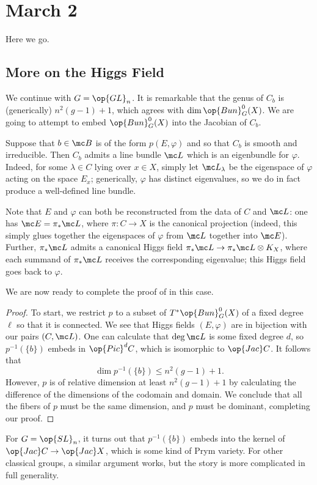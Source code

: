 \documentclass[../notes.tex]{subfiles}
\begin{document}
\section{March 2}
Here we go.

\subsection{More on the Higgs Field}
We continue with $G=\op{GL}_n$. It is remarkable that the genus of $C_b$ is (generically) $n^2(g-1)+1$, which agrees with $\dim\op{Bun}_G^0(X)$. We are going to attempt to embed $\op{Bun}_G^0(X)$ into the Jacobian of $C_b$.
\begin{remark}
	Suppose that $b\in\mc B$ is of the form $p(E,\varphi)$ and so that $C_b$ is smooth and irreducible. Then $C_b$ admits a line bundle $\mc L$ which is an eigenbundle for $\varphi$. Indeed, for some $\lambda\in C$ lying over $x\in X$, simply let $\mc L_\lambda$ be the eigenspace of $\varphi$ acting on the space $E_x$; generically, $\varphi$ has distinct eigenvalues, so we do in fact produce a well-defined line bundle.
\end{remark}
\begin{remark}
	Note that $E$ and $\varphi$ can both be reconstructed from the data of $C$ and $\mc L$: one has $\mc E=\pi_*\mc L$, where $\pi\colon C\to X$ is the canonical projection (indeed, this simply glues together the eigenspaces of $\varphi$ from $\mc L$ together into $\mc E$). Further, $\pi_*\mc L$ admits a canonical Higgs field $\pi_*\mc L\to\pi_*\mc L\otimes K_X$, where each summand of $\pi_*\mc L$ receives the corresponding eigenvalue; this Higgs field goes back to $\varphi$.
\end{remark}
We are now ready to complete the proof of  in this case.
\begin{proof}
	To start, we restrict $p$ to a subset of $T^*\op{Bun}_G^0(X)$ of a fixed degree $\ell$ so that it is connected. We see that Higgs fields $(E,\varphi)$ are in bijection with our pairs $(C,\mc L)$. One can calculate that $\deg\mc L$ is some fixed degree $d$, so $p^{-1}(\{b\})$ embeds in $\op{Pic}^dC$, which is isomorphic to $\op{Jac}C$. It follows that
	\[\dim p^{-1}(\{b\})\le n^2(g-1)+1.\]
	However, $p$ is of relative dimension at least $n^2(g-1)+1$ by calculating the difference of the dimensions of the codomain and domain. We conclude that all the fibers of $p$ must be the same dimension, and $p$ must be dominant, completing our proof.
\end{proof}
\begin{remark}
	For $G=\op{SL}_n$, it turns out that $p^{-1}(\{b\})$ embeds into the kernel of $\op{Jac}C\to\op{Jac}X$, which is some kind of Prym variety. For other classical groups, a similar argument works, but the story is more complicated in full generality.
\end{remark}
\end{document}
